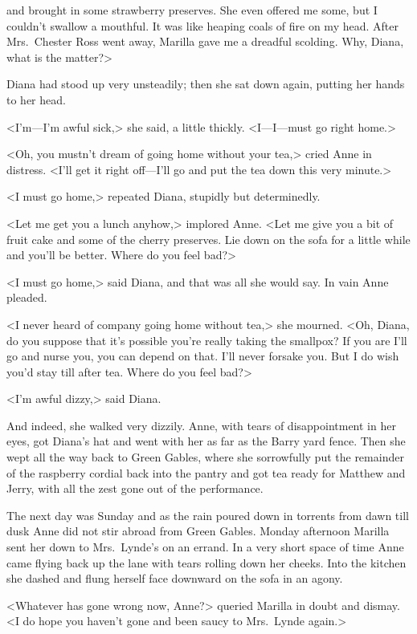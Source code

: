 and brought in some strawberry preserves. She even offered me some, but I couldn't swallow a mouthful. It was like heaping coals of fire on my head. After Mrs.~Chester Ross went away, Marilla gave me a dreadful scolding. Why, Diana, what is the matter?>

Diana had stood up very unsteadily; then she sat down again, putting her hands to her head.

<I'm—I'm awful sick,> she said, a little thickly. <I—I—must go right home.>

<Oh, you mustn't dream of going home without your tea,> cried Anne in distress. <I'll get it right off—I'll go and put the tea down this very minute.>

<I must go home,> repeated Diana, stupidly but determinedly.

<Let me get you a lunch anyhow,> implored Anne. <Let me give you a bit of fruit cake and some of the cherry preserves. Lie down on the sofa for a little while and you'll be better. Where do you feel bad?>

<I must go home,> said Diana, and that was all she would say. In vain Anne pleaded.

<I never heard of company going home without tea,> she mourned. <Oh, Diana, do you suppose that it's possible you're really taking the smallpox? If you are I'll go and nurse you, you can depend on that. I'll never forsake you. But I do wish you'd stay till after tea. Where do you feel bad?>

<I'm awful dizzy,> said Diana.

And indeed, she walked very dizzily. Anne, with tears of disappointment in her eyes, got Diana's hat and went with her as far as the Barry yard fence. Then she wept all the way back to Green Gables, where she sorrowfully put the remainder of the raspberry cordial back into the pantry and got tea ready for Matthew and Jerry, with all the zest gone out of the performance.

The next day was Sunday and as the rain poured down in torrents from dawn till dusk Anne did not stir abroad from Green Gables. Monday afternoon Marilla sent her down to Mrs.~Lynde's on an errand. In a very short space of time Anne came flying back up the lane with tears rolling down her cheeks. Into the kitchen she dashed and flung herself face downward on the sofa in an agony.

<Whatever has gone wrong now, Anne?> queried Marilla in doubt and dismay. <I do hope you haven't gone and been saucy to Mrs.~Lynde again.>

